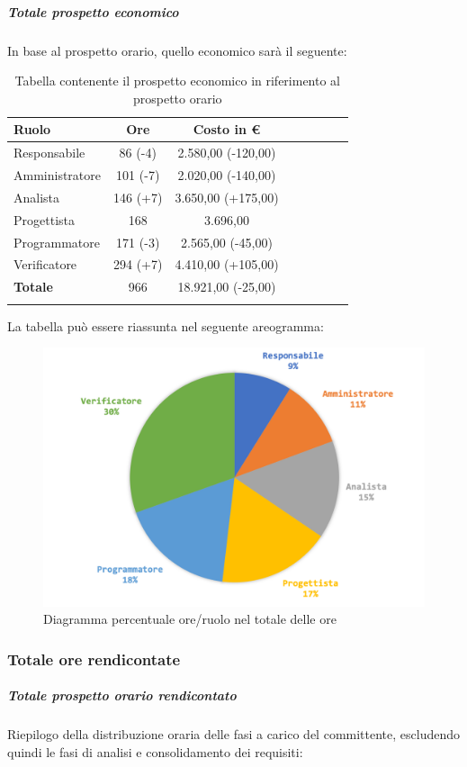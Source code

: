 		\subparagraph{Totale prospetto economico}
		In base al prospetto orario, quello economico sarà il seguente: 
		
		\begin{longtable}{|l|c|c|c|c|c|c|c|}
			\hline
			\rowcolor{lighter-grayer}
			\textbf{Ruolo} & \textbf{Ore} & \textbf{Costo in € } \\
			\hline
			\endfirsthead
			
			\hline
			Responsabile 	    & 86 (-4) & 2.580,00 (-120,00)\\
			\hline 
			\hline
			Amministratore	  & 101 (-7) & 2.020,00 (-140,00)\\
			\hline
			\hline
			Analista 				& 146 (+7) & 3.650,00 (+175,00)\\
			\hline
			\hline
			Progettista 		  & 168 & 3.696,00\\
			\hline
			\hline
			Programmatore 	 & 171 (-3) & 2.565,00 (-45,00)\\
			\hline
			\hline
			Verificatore 		  & 294 (+7) & 4.410,00 (+105,00)\\
			\hline
			\textbf{Totale} 	& 966 & 18.921,00 (-25,00)\\
			\hline
			\caption{Tabella contenente il prospetto economico in riferimento al prospetto orario}
		\end{longtable}
		
		La tabella può essere riassunta nel seguente areogramma:
		\begin{figure}[H]
			\centering
			\includegraphics[width=0.8\linewidth]{./images/consuntivo/totOre2.png}
			\caption{Diagramma percentuale ore/ruolo nel totale delle ore}
			\label{fig:diagramma costi ruolo fase totale ore}
		\end{figure}
		\pagebreak
		
		\subsubsection{Totale ore rendicontate}
		\subparagraph{Totale prospetto orario rendicontato}
		Riepilogo della distribuzione oraria delle fasi a carico del committente, escludendo quindi le fasi di analisi e consolidamento dei requisiti:
		

